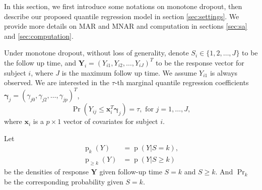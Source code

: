 \documentclass[12pt]{article}
\DeclareMathOperator{\pr}{p}
\DeclareMathOperator{\prob}{Pr}
\begin{document}
In this section, we first introduce some notations on monotone
dropout, then describe our proposed quantile regression model in
section \ref{sec:settings}. We provide more details on MAR and MNAR
and computation in sections \ref{sec:sa} and \ref{sec:computation}.

Under monotone dropout, without loss of generality, denote $S_i \in
\{1, 2, \ldots, J\}$ to be the follow up time, and $\bm Y_i = (Y_{i1},
Y_{i2}, \ldots, Y_{iJ})^{T}$ to be the response vector for subject
$i$, where $J$ is the maximum follow up time. We assume $Y_{i1}$ is
always observed. We are interested in the $\tau$-th marginal quantile
regression coefficients $\bm \gamma_j = (\gamma_{j0}, \gamma_{j2},
\ldots, \gamma_{jp})^T$,
\begin{equation}
  \label{eq:quantile}
  \prob (Y_{ij} \leq \bm x_i^{T} \bm \gamma_j ) = \tau, \text{ for } j = 1, \ldots, J,
\end{equation}
where $\bm x_i$ is a $p \times 1$ vector of covariates for subject $i$.

Let
\begin{align*}
  \pr_k(Y) &= \pr (Y | S = k), \\
  \pr_{\geq k} (Y) & = \pr (Y | S \geq k)
\end{align*}
be the densities of response $\bm Y$ given follow-up time $S=k$ and $S
\geq k$. And $\prob_k$ be the corresponding probability given $S = k$.
\end{document}
